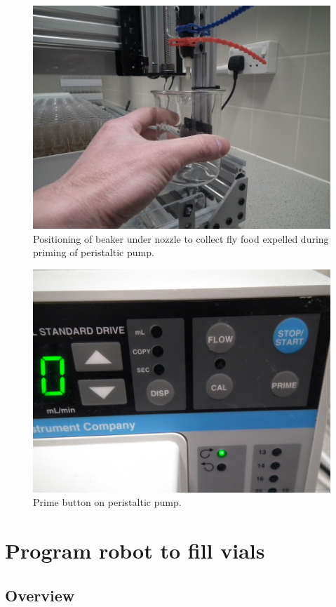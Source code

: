 \documentclass[]{book}
\theoremstyle{definition}
\theoremstyle{definition}
\theoremstyle{remark}
\begin{document}
\begin{figure}

{\centering \includegraphics[width=0.75\linewidth]{images/prime_beaker} 

}

\caption{Positioning of beaker under nozzle to collect fly food expelled during priming of peristaltic pump.}\label{fig:primeBeaker}
\end{figure}

\begin{figure}

{\centering \includegraphics[width=0.75\linewidth]{images/prime_button} 

}

\caption{Prime button on peristaltic pump.}\label{fig:primeButton}
\end{figure}

\chapter{Program robot to fill vials}\label{gcode}

\section{Overview}\label{overview-2}
\end{document}
